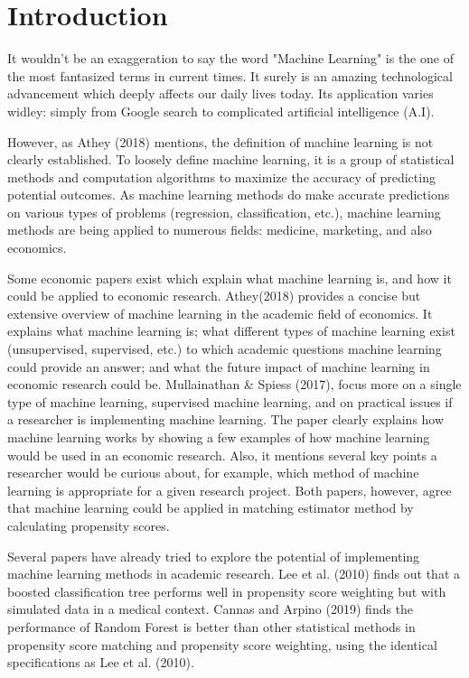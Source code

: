 \documentclass[11pt,a4paper,oneside]{article}
\begin{document}
\section{Introduction}
It wouldn't be an exaggeration to say the word "Machine Learning" is the one of the most fantasized terms in current times. It surely is an amazing technological advancement which deeply affects our daily lives today. Its application varies widley: simply from Google search to complicated artificial intelligence (A.I). 
\par
However, as Athey (2018)\cite{athey2018impact} mentions, the definition of machine learning is not clearly established. To loosely define machine learning, it is a group of statistical methods and computation algorithms to maximize the accuracy of predicting potential outcomes. As machine learning methods do make accurate predictions on various types of problems (regression, classification,  etc.), machine learning methods are being applied to numerous fields: medicine, marketing, and also economics.
\par
Some economic papers exist which explain what machine learning is, and how it could be applied to economic research. Athey(2018)\cite{athey2018impact} provides a concise  but extensive overview of machine learning in the academic field of economics. It explains what machine learning is; what  different types of machine learning exist (unsupervised, supervised, etc.) to which academic questions machine learning could provide an answer; and what the future impact of machine learning in economic research could be. Mullainathan \& Spiess (2017), focus more on a single type of machine learning, supervised machine learning, and on practical issues if a researcher is implementing machine learning. The paper clearly explains how machine learning works by showing a few examples of how machine learning would be used in an economic research. Also, it mentions several key points a researcher would be curious about, for example, which method of machine learning is appropriate for a given research project. Both papers, however, agree that machine learning could be applied in matching estimator method by calculating propensity scores.
\par
Several papers have already tried to explore the potential of implementing machine learning methods in academic research. Lee et al. (2010)\cite{lee2010improving} finds out that a boosted classification tree performs well in propensity score weighting but with simulated data in a medical context. Cannas and Arpino (2019)\cite{cannas2019comparison} finds the performance of Random Forest is better than other statistical methods in propensity score matching and propensity score weighting, using the identical specifications as Lee et al. (2010).\cite{lee2010improving} 
\end{document}
